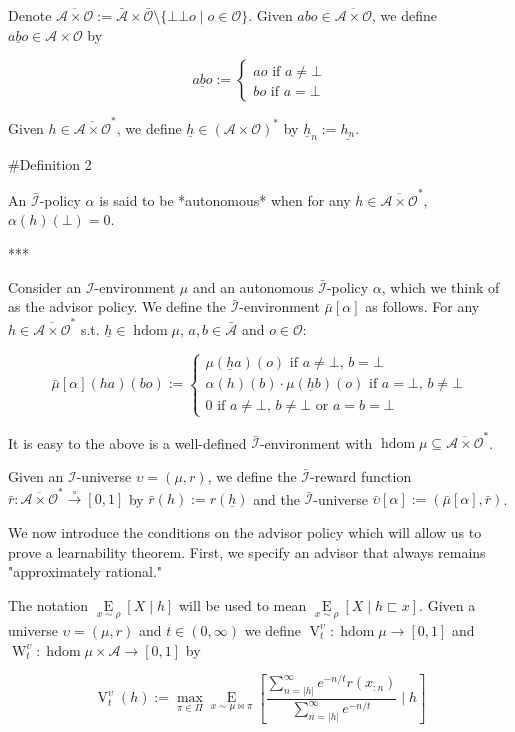 \documentclass[a4paper]{article}
\newcommand{\E}[1]{\underset{#1}{\operatorname{E}}}
\newcommand{\Abs}[1]{\lvert #1 \rvert}
\newcommand{\PF}{\xrightarrow{\circ}}
\newcommand{\Ob}{\mathcal{O}}
\newcommand{\A}{\mathcal{A}}
\newcommand{\I}{\mathcal{I}}
\newcommand{\FH}{(\A \times \Ob)^*}
\newcommand{\Ado}{\bar{\Ob}}
\newcommand{\Ada}{\bar{\A}}
\newcommand{\Adi}{\bar{\I}}
\newcommand{\Adao}{\overline{\A \times \Ob}}
\newcommand{\Adfh}{\Adao^*}
\DeclareMathOperator{\HD}{hdom}
\newcommand{\V}{\operatorname{V}}
\newcommand{\W}{\operatorname{W}}
\begin{document}
Denote $\Adao:= \Ada \times \Ado \setminus \{\bot\bot o \mid o \in \Ob\}$. Given $abo \in \Adao$, we define $\underline{abo} \in \A \times \Ob$ by

$$\underline{abo}:=\begin{cases} ao \text{ if } a\ne\bot \\ bo \text{ if } a=\bot \end{cases}$$

Given $h \in \Adfh$, we define $\underline{h} \in \FH$ by $\underline{h}_n:=\underline{h_n}$. 

\#Definition 2

An $\Adi$-policy $\alpha$ is said to be *autonomous* when for any $h \in \Adfh$, $\alpha(h)(\bot)=0$.

***

Consider an $\I$-environment $\mu$ and an autonomous $\Adi$-policy $\alpha$, which we think of as the advisor policy. We define the $\Adi$-environment $\bar{\mu}[\alpha]$ as follows. For any $h \in \Adfh$ s.t. $\underline{h} \in \HD \mu$, $a,b \in \Ada$ and $o \in \Ob$:

$$\bar{\mu}[\alpha](ha)(bo):=\begin{cases} \mu(\underline{h}a)(o) \text{ if } a\ne\bot,\, b=\bot \\ \alpha(h)(b)\cdot\mu(\underline{h}b)(o) \text{ if } a=\bot,\,b\ne\bot \\ 0 \text{ if } a\ne\bot,\, b\ne\bot \text{ or } a=b=\bot \end{cases}$$

It is easy to the above is a well-defined $\Adi$-environment with $\HD \mu \subseteq \Adfh$. 

Given an $\I$-universe $\upsilon=(\mu,r)$, we define the $\Adi$-reward function $\bar{r}: \Adfh \PF [0,1]$ by $\bar{r}(h):=r(\underline{h})$ and the $\Adi$-universe $\bar{\upsilon}[\alpha]:=(\bar{\mu}[\alpha],\bar{r})$.

We now introduce the conditions on the advisor policy which will allow us to prove a learnability theorem. First, we specify an advisor that always remains "approximately rational."

The notation $\E{x \sim \rho}[X \mid h]$ will be used to mean $\E{x \sim \rho}[X \mid h \sqsubset x]$. Given a universe $\upsilon=(\mu,r)$ and $t \in (0, \infty)$ we define $\V_t^\upsilon: \HD{\mu} \rightarrow [0,1]$ and $\W_t^\upsilon: \HD{\mu} \times \A \rightarrow [0,1]$ by

$$\V_t^\upsilon(h):=\max_{\pi \in \Pi} {\E{x \sim \mu\bowtie\pi}[\frac{\sum_{n=\Abs{h}}^\infty e^{-n/t} r(x_{:n})}{\sum_{n=\Abs{h}}^\infty e^{-n/t}} \mid h]}$$
\end{document}
